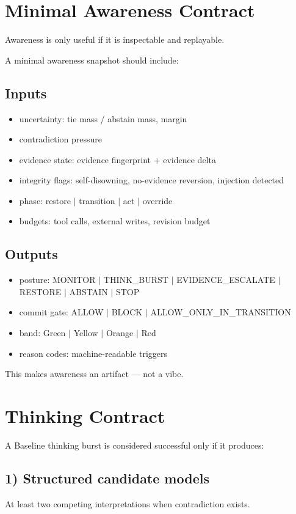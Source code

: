\documentclass[11pt]{article}
\begin{document}
\section{Minimal Awareness Contract}
Awareness is only useful if it is inspectable and replayable.

A minimal awareness snapshot should include:

\subsection*{Inputs}
\begin{itemize}[leftmargin=2em]
  \item uncertainty: tie mass / abstain mass, margin
  \item contradiction pressure
  \item evidence state: evidence fingerprint + evidence delta
  \item integrity flags: self-disowning, no-evidence reversion, injection detected
  \item phase: restore $\mid$ transition $\mid$ act $\mid$ override
  \item budgets: tool calls, external writes, revision budget
\end{itemize}

\subsection*{Outputs}
\begin{itemize}[leftmargin=2em]
  \item posture: MONITOR $\mid$ THINK\_BURST $\mid$ EVIDENCE\_ESCALATE $\mid$ RESTORE $\mid$ ABSTAIN $\mid$ STOP
  \item commit gate: ALLOW $\mid$ BLOCK $\mid$ ALLOW\_ONLY\_IN\_TRANSITION
  \item band: Green $\mid$ Yellow $\mid$ Orange $\mid$ Red
  \item reason codes: machine-readable triggers
\end{itemize}

This makes awareness an artifact --- not a vibe.

\section{Thinking Contract}
A Baseline thinking burst is considered successful only if it produces:

\subsection*{1) Structured candidate models}
At least two competing interpretations when contradiction exists.
\end{document}
